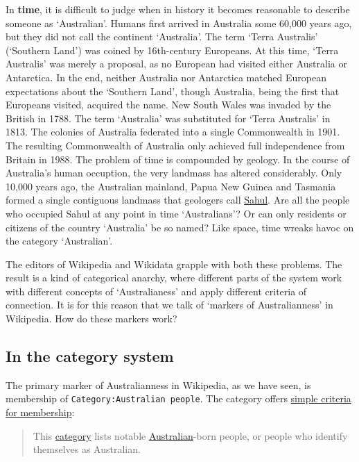 \documentclass[
  a4paper,
  DIV=11,
  numbers=noendperiod]{scrreprt}
\begin{document}
In \textbf{time}, it is difficult to judge when in history it becomes
reasonable to describe someone as `Australian'. Humans first arrived in
Australia some 60,000 years ago, but they did not call the continent
`Australia'. The term `Terra Australis' (`Southern Land') was coined by
16th-century Europeans. At this time, `Terra Australis' was merely a
proposal, as no European had visited either Australia or Antarctica. In
the end, neither Australia nor Antarctica matched European expectations
about the `Southern Land', though Australia, being the first that
Europeans visited, acquired the name. New South Wales was invaded by the
British in 1788. The term `Australia' was substituted for `Terra
Australis' in 1813. The colonies of Australia federated into a single
Commonwealth in 1901. The resulting Commonwealth of Australia only
achieved full independence from Britain in 1988. The problem of time is
compounded by geology. In the course of Australia's human occuption, the
very landmass has altered considerably. Only 10,000 years ago, the
Australian mainland, Papua New Guinea and Tasmania formed a single
contiguous landmass that geologers call
\href{https://en.wikipedia.org/wiki/Sahul}{Sahul}. Are all the people
who occupied Sahul at any point in time `Australians'? Or can only
residents or citizens of the country `Australia' be so named? Like
space, time wreaks havoc on the category `Australian'.

The editors of Wikipedia and Wikidata grapple with both these problems.
The result is a kind of categorical anarchy, where different parts of
the system work with different concepts of `Australianess' and apply
different criteria of connection. It is for this reason that we talk of
`markers of Australianness' in Wikipedia. How do these markers work?

\hypertarget{in-the-category-system}{%
\subsection{In the category system}\label{in-the-category-system}}

The primary marker of Australianness in Wikipedia, as we have seen, is
membership of \texttt{Category:Australian\ people}. The category offers
\href{https://en.wikipedia.org/w/index.php?title=Category:Australian_people\&oldid=1148961840}{simple
criteria for membership}:

\begin{quote}
This
\href{https://en.wikipedia.org/w/index.php?title=Wikipedia:Categorization\&oldid=1181497476}{category}
lists notable
\href{https://en.wikipedia.org/wiki/Australia}{Australian}-born people,
or people who identify themselves as Australian.
\end{quote}
\end{document}
